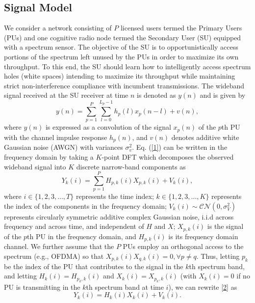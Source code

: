 \documentclass[10pt,twocolumn]{IEEEtran}
\begin{document}
\subsection{Signal Model}\label{A}
We consider a network consisting of $P$ licensed users termed the Primary Users (PUs) and one cognitive radio node termed the Secondary User (SU) equipped with a spectrum sensor. The objective of the SU is to opportunistically access portions of the spectrum left unused by the PUs in order to maximize its own throughput. To this end, the SU should learn 
how to intelligently access spectrum holes (white spaces) intending to maximize its throughput while maintaining strict non-interference compliance with incumbent transmissions.
The wideband signal received at the SU receiver at time $n$ is denoted as $y(n)$ and is given by 
\begin{equation}\label{1}
    y(n) = \sum_{p=1}^{P} \sum_{l=0}^{L_{p}-1} h_{p}(l)x_{p}(n-l) + v(n),
\end{equation}
where $y(n)$ is expressed as a convolution of the signal $x_{p}(n)$ of the $p$th PU with the channel impulse response $h_{p}(n)$, and $v(n)$ denotes additive white Gaussian noise (AWGN) with variances $\sigma_v^2$. Eq. (\ref{1}) can be written in the frequency domain by taking a $K$-point DFT which decomposes the observed wideband signal into $K$ discrete narrow-band components as 
\begin{equation}\label{2}
    Y_k(i) = \sum_{p=1}^{P} H_{p,k}(i)X_{p,k}(i) + V_k(i),
\end{equation}
where $i {\in} \{1,2,3,\dots,T\}$ represents the time index; $k {\in} \{1,2,3,\dots,K\}$ represents the index of the components in the frequency domain; $V_k(i) {\sim} \mathcal{CN}(0,\sigma_V^2)$ represents circularly symmetric additive complex Gaussian noise, i.i.d across frequency and across time, and independent of $H$ and $X$; $X_{p,k}(i)$ is the signal of the $p$th PU in the frequency domain, and $H_{p,k}(i)$ is its frequency domain channel. We further assume that the $P$ PUs employ an orthogonal access to the spectrum (e.g., OFDMA) so that $X_{p,k}(i)X_{q,k}(i)=0, \forall p\neq q$. Thus, letting $p_k$ be the index of the PU that contributes to the signal in the $k$th spectrum band, and letting  $H_{k}(i){=}H_{p_k,k}(i)$ and $X_{k}(i){=}X_{p_k,k}(i)$ (with $X_{k}(i){=}0$ if no PU is transmitting in the $k$th spectrum band at time $i$), we can rewrite \eqref{2} as 
\begin{equation}\label{3}
    Y_k(i) = H_{k}(i)X_{k}(i) + V_k(i).
\end{equation}
\end{document}
